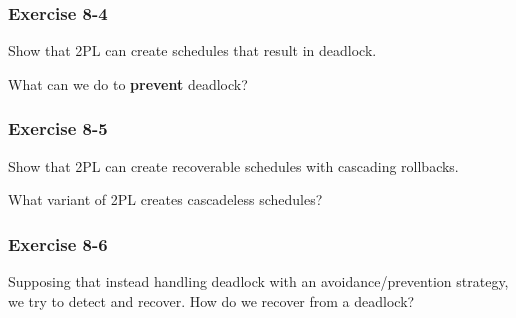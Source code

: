 \begin{frame}
\frametitle{Exercise 8-4}

Show that 2PL can create schedules that result in deadlock.

What can we do to \textbf{prevent} deadlock?

\end{frame}


\begin{frame}
\frametitle{Exercise 8-5}

Show that 2PL can create recoverable schedules with cascading rollbacks.

What variant of 2PL creates cascadeless schedules?

\end{frame}


\begin{frame}
\frametitle{Exercise 8-6}

Supposing that instead handling deadlock with an avoidance/prevention strategy, we try to detect and recover. How do we recover from a deadlock?

\end{frame}




